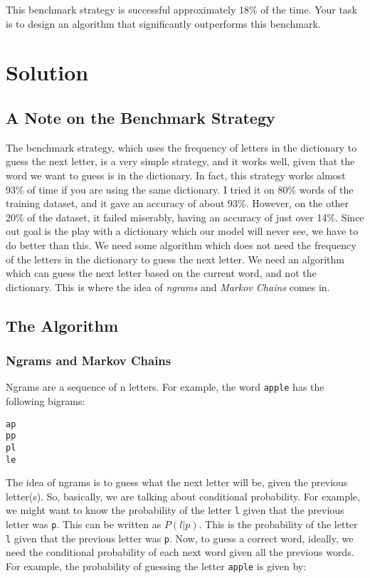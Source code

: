 \documentclass[12pt]{article}
\begin{document}
This benchmark strategy is successful approximately 18\% of the time. Your task is to design an algorithm that significantly outperforms this benchmark.

\section{Solution}
\subsection{A Note on the Benchmark Strategy}
The benchmark strategy, which uses the frequency of letters in the dictionary to guess the next letter, is a very simple strategy, and it works well, given that the word we want to guess is in the dictionary. In fact, this strategy works almost 93\% of time if you are using the same dictionary. I tried it on 80\% words of the training dataset, and it gave an accuracy of about 93\%. However, on the other 20\% of the dataset, it failed miserably, having an accuracy of just over 14\%. Since out goal is the play with a dictionary which our model will never see, we have to do better than this. We need some algorithm which does not need the frequency of the letters in the dictionary to guess the next letter. We need an algorithm which can guess the next letter based on the current word, and not the dictionary. This is where the idea of \textit{ngrams} and \textit{Markov Chains} comes in.

\subsection{The Algorithm}

\subsubsection{Ngrams and Markov Chains}
Ngrams are a sequence of n letters. For example, the word \verb|apple| has the following bigrams:
\begin{verbatim}
ap
pp
pl
le
\end{verbatim}
The idea of ngrams is to guess what the next letter will be, given the previous letter(s). So, basically, we are talking about conditional probability. For example, we might want to know the probability of the letter \verb|l| given that the previous letter was \verb|p|. This can be written as $P(l|p)$. This is the probability of the letter \verb|l| given that the previous letter was \verb|p|. Now, to guess a correct word, ideally, we need the conditional probability of each next word given all the previous words. For example, the probability of guessing the letter \verb|apple| is given by:
\end{document}
